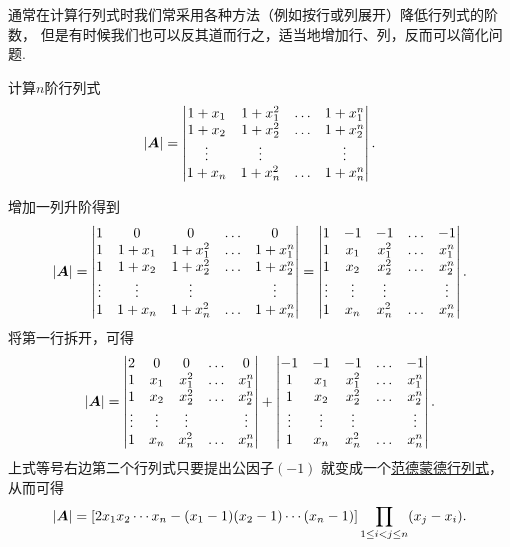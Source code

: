 通常在计算行列式时我们常采用各种方法（例如按行或列展开）降低行列式的阶数，
但是有时候我们也可以反其道而行之，适当地增加行、列，反而可以简化问题.
\begin{example}
计算\(n\)阶行列式\[
	\abs{\boldsymbol{A}} = \begin{vmatrix}
		1 + x_1 & 1 + x_1^2 & \dots & 1 + x_1^n \\
		1 + x_2 & 1 + x_2^2 & \dots & 1 + x_2^n \\
		\vdots & \vdots & & \vdots \\
		1 + x_n & 1 + x_n^2 & \dots & 1 + x_n^n
	\end{vmatrix}.
\]
\begin{solution}
增加一列升阶得到\[
	\abs{\boldsymbol{A}} = \begin{vmatrix}
		1 & 0 & 0 & \dots & 0 \\
		1 & 1 + x_1 & 1 + x_1^2 & \dots & 1 + x_1^n \\
		1 & 1 + x_2 & 1 + x_2^2 & \dots & 1 + x_2^n \\
		\vdots & \vdots & \vdots & & \vdots \\
		1 & 1 + x_n & 1 + x_n^2 & \dots & 1 + x_n^n
	\end{vmatrix}
	= \begin{vmatrix}
		1 & -1 & -1 & \dots & -1 \\
		1 & x_1 & x_1^2 & \dots & x_1^n \\
		1 & x_2 & x_2^2 & \dots & x_2^n \\
		\vdots & \vdots & \vdots & & \vdots \\
		1 & x_n & x_n^2 & \dots & x_n^n
	\end{vmatrix}.
\]
将第一行拆开，可得\[
	\abs{\boldsymbol{A}} = \begin{vmatrix}
		2 & 0 & 0 & \dots & 0 \\
		1 & x_1 & x_1^2 & \dots & x_1^n \\
		1 & x_2 & x_2^2 & \dots & x_2^n \\
		\vdots & \vdots & \vdots & & \vdots \\
		1 & x_n & x_n^2 & \dots & x_n^n
	\end{vmatrix}
	+ \begin{vmatrix}
		-1 & -1 & -1 & \dots & -1 \\
		1 & x_1 & x_1^2 & \dots & x_1^n \\
		1 & x_2 & x_2^2 & \dots & x_2^n \\
		\vdots & \vdots & \vdots & & \vdots \\
		1 & x_n & x_n^2 & \dots & x_n^n
	\end{vmatrix}.
\]
上式等号右边第二个行列式只要提出公因子\((-1)\)
就变成一个\hyperref[equation:行列式.范德蒙德行列式]{范德蒙德行列式}，
从而可得\[
	\abs{\boldsymbol{A}}
	= \left[ 2 x_1 x_2 \dotsm x_n - (x_1 - 1)(x_2 - 1)\dotsm(x_n - 1) \right]
	\prod_{1 \leq i < j \leq n} (x_j - x_i).
\]
\end{solution}
\end{example}

